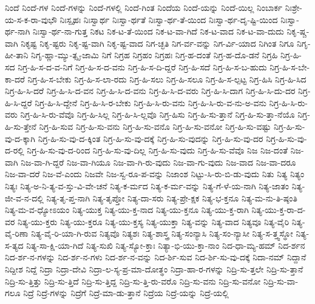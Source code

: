 {ನಿಂದೆ
ನಿಂದೆ-ಗಳ
ನಿಂದೆ-ಗಳನ್ನು
ನಿಂದೆ-ಗಳಲ್ಲಿ
ನಿಂದೆ-ಗಿಂತ
ನಿಂದೆಯ
ನಿಂದೆ-ಯನ್ನು
ನಿಂದೆ-ಯಿಲ್ಲ
ನಿಂಬಾರ್ಕ
ನಿಃಶ್ರೇ-ಯ-ಸ-ಕ-ರಾ-ವುಭೌ
ನಿಃಸ್ಪೃಹಃ
ನಿಃಸ್ವಾರ್ಥ
ನಿಃಸ್ವಾ-ರ್ಥತೆ
ನಿಃಸ್ವಾ-ರ್ಥ-ತೆ-ಯಿಂದ
ನಿಃಸ್ವಾ-ರ್ಥ-ದೃ-ಷ್ಟಿ-ಯಿಂದ
ನಿಃಸ್ವಾ-ರ್ಥ-ನಾಗಿ
ನಿಃಸ್ವಾ-ರ್ಥ-ನಾ-ಗುತ್ತ
ನಿಕಟ
ನಿಕ-ಟ-ತೆ-ಯಿಂದ
ನಿಕ-ಟ-ವಾ-ಗಿದೆ
ನಿಕ-ಟ-ವಾದ
ನಿಕ-ಟ-ವಾ-ದುದು
ನಿಕೃ-ಷ್ಚ-ವಾಗಿ
ನಿಕೃಷ್ಟ
ನಿಕೃ-ಷ್ಟರು
ನಿಕೃ-ಷ್ಟ-ವಾಗಿ
ನಿಕೃ-ಷ್ಟ-ವಾದ
ನಿಗ-ಚ್ಛತಿ
ನಿಗ-ರ್ವ-ವನ್ನು
ನಿಗ-ರ್ವಿ-ಯಾದ
ನಿಗಿಂತ
ನಿಗೂ
ನಿಗೃ-ಹೀ-ತಾನಿ
ನಿಗೃ-ಹ್ಣಾ-ಮ್ಯು-ತ್ಸೃ-ಜಾಮಿ
ನಿಗೆ
ನಿಗ್ರಹ
ನಿಗ್ರಹಂ
ನಿಗ್ರಹಃ
ನಿಗ್ರ-ಹ-ದಂತೆ
ನಿಗ್ರ-ಹ-ದೊ-ಡನೆ
ನಿಗ್ರಹಿ
ನಿಗ್ರ-ಹಿ-ಸದ
ನಿಗ್ರ-ಹಿ-ಸ-ದ-ವ-ನಿಗೆ
ನಿಗ್ರ-ಹಿ-ಸ-ದ-ವನು
ನಿಗ್ರ-ಹಿ-ಸ-ದಿ-ದ್ದರೆ
ನಿಗ್ರ-ಹಿ-ಸದೆ
ನಿಗ್ರ-ಹಿ-ಸ-ಬ-ಹುದು
ನಿಗ್ರ-ಹಿ-ಸ-ಬೇ-ಕಾ-ದರೆ
ನಿಗ್ರ-ಹಿ-ಸ-ಬೇಕು
ನಿಗ್ರ-ಹಿ-ಸ-ಲಾ-ರದು
ನಿಗ್ರ-ಹಿ-ಸಲು
ನಿಗ್ರ-ಹಿ-ಸಲೂ
ನಿಗ್ರ-ಹಿ-ಸ-ಲ್ಪಟ್ಟ
ನಿಗ್ರ-ಹಿಸಿ
ನಿಗ್ರ-ಹಿ-ಸಿದ
ನಿಗ್ರ-ಹಿ-ಸಿ-ದರೆ
ನಿಗ್ರ-ಹಿ-ಸಿ-ದ-ವನ
ನಿಗ್ರ-ಹಿ-ಸಿ-ದ-ವನು
ನಿಗ್ರ-ಹಿ-ಸಿ-ದ-ವರು
ನಿಗ್ರ-ಹಿ-ಸಿ-ದಾಗ
ನಿಗ್ರ-ಹಿ-ಸಿ-ದು-ದರ
ನಿಗ್ರ-ಹಿ-ಸಿ-ದ್ದರೆ
ನಿಗ್ರ-ಹಿ-ಸಿ-ದ್ದೇನೆ
ನಿಗ್ರ-ಹಿ-ಸಿ-ರ-ಬೇಕು
ನಿಗ್ರ-ಹಿ-ಸಿ-ರು-ವನು
ನಿಗ್ರ-ಹಿ-ಸಿ-ರು-ವ-ನು-ಅ-ವನು
ನಿಗ್ರ-ಹಿ-ಸಿ-ರು-ವರು
ನಿಗ್ರ-ಹಿ-ಸಿ-ರು-ವೆವೊ
ನಿಗ್ರ-ಹಿ-ಸಿಲ್ಲ
ನಿಗ್ರ-ಹಿ-ಸಿ-ಲ್ಲವೊ
ನಿಗ್ರ-ಹಿಸು
ನಿಗ್ರ-ಹಿ-ಸು-ತ್ತಾನೆ
ನಿಗ್ರ-ಹಿ-ಸು-ತ್ತಾ-ನೆಯೊ
ನಿಗ್ರ-ಹಿ-ಸು-ತ್ತೇನೆ
ನಿಗ್ರ-ಹಿ-ಸುವ
ನಿಗ್ರ-ಹಿ-ಸು-ವನು
ನಿಗ್ರ-ಹಿ-ಸು-ವನೊ
ನಿಗ್ರ-ಹಿ-ಸು-ವನೋ
ನಿಗ್ರ-ಹಿ-ಸು-ವಷ್ಟು
ನಿಗ್ರ-ಹಿ-ಸು-ವು-ದ-ಕ್ಕಾಗಿ
ನಿಗ್ರ-ಹಿ-ಸು-ವು-ದ-ಕ್ಕಿಂತ
ನಿಗ್ರ-ಹಿ-ಸು-ವು-ದಕ್ಕೆ
ನಿಗ್ರ-ಹಿ-ಸು-ವುದನ್ನು
ನಿಗ್ರ-ಹಿ-ಸು-ವು-ದರ
ನಿಗ್ರ-ಹಿ-ಸು-ವು-ದ-ರಲ್ಲಿ
ನಿಗ್ರ-ಹಿ-ಸು-ವು-ದ-ರಿಂದ
ನಿಗ್ರ-ಹಿ-ಸು-ವು-ದಿಲ್ಲ
ನಿಗ್ರ-ಹಿ-ಸು-ವುದು
ನಿಗ್ರ-ಹಿ-ಸು-ವೆವೊ
ನಿಜ
ನಿಜ-ದಂತೆ
ನಿಜ-ವಾಗಿ
ನಿಜ-ವಾ-ಗಿ-ದ್ದರೆ
ನಿಜ-ವಾ-ಗಿಯೂ
ನಿಜ-ವಾ-ಗಿ-ರು-ವುದು
ನಿಜ-ವಾ-ಗು-ವುದು
ನಿಜ-ವಾದ
ನಿಜ-ವಾ-ದರೂ
ನಿಜ-ವಾ-ದರೆ
ನಿಜ-ವೆ-ಎಂದು
ನಿಜವೇ
ನಿಜ-ಸ್ವ-ರೂ-ಪ-ವನ್ನು
ನಿಜಾಂಶ
ನಿಟ್ಟು-ಸಿ-ರು-ಬಿ-ಡು-ವುದು
ನಿತು
ನಿತ್ಯ
ನಿತ್ಯಂ
ನಿತ್ಯಃ
ನಿತ್ಯ-ಅ-ನಿ-ತ್ಯ-ವ-ಸ್ತು-ವಿ-ವೇ-ಚನೆ
ನಿತ್ಯ-ಕ-ರ್ಮದ
ನಿತ್ಯ-ಕ-ರ್ಮ-ವನ್ನು
ನಿತ್ಯ-ಗೆ-ಳೆ-ಯ-ನಾಗಿ
ನಿತ್ಯ-ಜಾತಂ
ನಿತ್ಯ-ಜೀ-ವ-ನ-ದಲ್ಲಿ
ನಿತ್ಯ-ತೃ-ಪ್ತ-ನಾಗಿ
ನಿತ್ಯ-ತೃಪ್ತೋ
ನಿತ್ಯ-ದಾ-ಸರು
ನಿತ್ಯ-ಪ್ರೇ-ಕ್ಷಕ
ನಿತ್ಯ-ಭ-ಕ್ತನೂ
ನಿತ್ಯ-ಮ-ನು-ತಿ-ಷ್ಠಂತಿ
ನಿತ್ಯ-ಮ-ವ-ಧ್ಯೋಽಯಂ
ನಿತ್ಯ-ಯುಕ್ತ
ನಿತ್ಯ-ಯು-ಕ್ತ-ನಾದ
ನಿತ್ಯ-ಯು-ಕ್ತನೂ
ನಿತ್ಯ-ಯು-ಕ್ತ-ರಾಗಿ
ನಿತ್ಯ-ಯು-ಕ್ತ-ರಾ-ದ-ವರ
ನಿತ್ಯ-ಯು-ಕ್ತರು
ನಿತ್ಯ-ಯು-ಕ್ತರೂ
ನಿತ್ಯ-ಯು-ಕ್ತಸ್ಯ
ನಿತ್ಯ-ಯುಕ್ತಾ
ನಿತ್ಯ-ವನ್ನು
ನಿತ್ಯ-ವಾದ
ನಿತ್ಯವೂ
ನಿತ್ಯ-ವೈರಿ
ನಿತ್ಯ-ವೈ-ರಿಣಾ
ನಿತ್ಯ-ವೈ-ರಿ-ಯಾ-ಗಿ-ರುವ
ನಿತ್ಯವೊ
ನಿತ್ಯಶಃ
ನಿತ್ಯ-ಶಾಸ್ತ್ರ
ನಿತ್ಯ-ಸಂನ್ಯಾಸಿ
ನಿತ್ಯ-ಸಂ-ನ್ಯಾಸೀ
ನಿತ್ಯ-ಸ-ತ್ತ್ವಸ್ಥೋ
ನಿತ್ಯ-ಸ-ತ್ಯದ
ನಿತ್ಯ-ಸಾ-ಕ್ಷಿ-ಯಾ-ಗಿದೆ
ನಿತ್ಯ-ಸುಖಿ
ನಿತ್ಯ-ಸ್ಯೋ-ಕ್ತಾಃ
ನಿತ್ಯಾ-ಭಿ-ಯು-ಕ್ತಾ-ನಾಂ
ನಿದ-ಧಾ-ಮ್ಯ-ಹಮ್
ನಿದ-ರ್ಶನ
ನಿದ-ರ್ಶ-ನ-ಗಳನ್ನು
ನಿದ-ರ್ಶ-ನ-ಗಳು
ನಿದ-ರ್ಶ-ನ-ವನ್ನು
ನಿದ-ರ್ಶಿ-ಸುವ
ನಿದ-ರ್ಶಿ-ಸು-ವು-ದಕ್ಕೆ
ನಿದಾ-ನಮ್
ನಿದ್ದಾನೆ
ನಿದ್ದೀಶ
ನಿದ್ದೆ
ನಿದ್ರಾ
ನಿದ್ರಾ-ದೇವಿ
ನಿದ್ರಾ-ಲ-ಸ್ಯ-ಪ್ರ-ಮಾ-ದೋತ್ಥಂ
ನಿದ್ರಾ-ಹಾ-ರ-ಗಳನ್ನು
ನಿದ್ರಿ-ಸು-ತ್ತಲೇ
ನಿದ್ರಿ-ಸು-ತ್ತಾನೆ
ನಿದ್ರಿ-ಸು-ತ್ತಿತ್ತು
ನಿದ್ರಿ-ಸು-ತ್ತಿದೆ
ನಿದ್ರಿ-ಸು-ತ್ತಿದ್ದ
ನಿದ್ರಿ-ಸು-ತ್ತಿ-ರು-ವರೊ
ನಿದ್ರಿ-ಸು-ವನು
ನಿದ್ರಿ-ಸು-ವನೋ
ನಿದ್ರಿ-ಸು-ವಾ-ಗಲೂ
ನಿದ್ರೆ
ನಿದ್ರೆ-ಗಳನ್ನು
ನಿದ್ರೆಗೆ
ನಿದ್ರೆ-ಮಾ-ಡು-ತ್ತಾನೆ
ನಿದ್ರೆಯ
ನಿದ್ರೆ-ಯನ್ನು
ನಿದ್ರೆ-ಯಲ್ಲಿ
}
